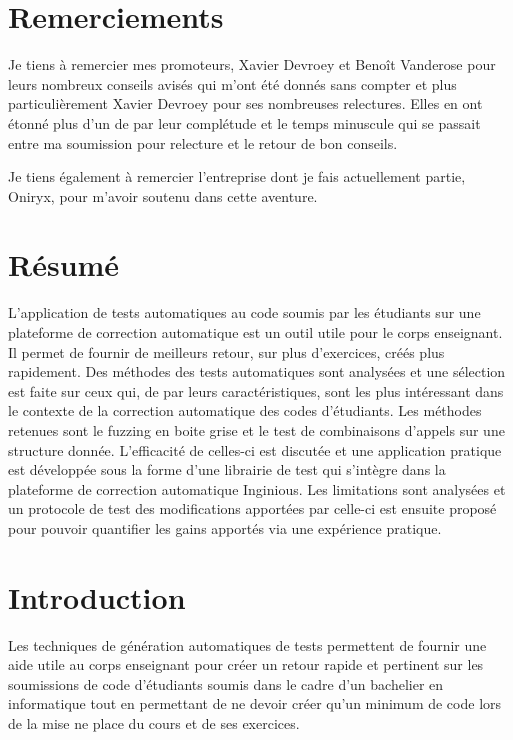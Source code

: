\documentclass[a4paper]{report}
\begin{document}
\nocite{*}
\chapter*{Remerciements}

Je tiens à remercier mes promoteurs, Xavier Devroey et Benoît Vanderose pour leurs nombreux conseils avisés qui m'ont été donnés sans compter et plus particulièrement Xavier Devroey pour ses nombreuses relectures.
Elles en ont étonné plus d'un de par leur complétude et le temps minuscule qui se passait entre ma soumission pour relecture et le retour de bon conseils.

Je tiens également à remercier l'entreprise dont je fais actuellement partie, Oniryx, pour m'avoir soutenu dans cette aventure.


\chapter*{Résumé}

L'application de tests automatiques au code soumis par les étudiants sur une plateforme de correction automatique est un outil utile pour le corps enseignant.
Il permet de fournir de meilleurs retour, sur plus d'exercices, créés plus rapidement.
Des méthodes des tests automatiques sont analysées et une sélection est faite sur ceux qui, de par leurs caractéristiques, sont les plus intéressant dans le contexte de la correction automatique des codes d'étudiants.
Les méthodes retenues sont le fuzzing en boite grise et le test de combinaisons d'appels sur une structure donnée.
L'efficacité de celles-ci est discutée et une application pratique est développée sous la forme d'une librairie de test qui s'intègre dans la plateforme de correction automatique Inginious.
Les limitations sont analysées et un protocole de test des modifications apportées par celle-ci est ensuite proposé pour pouvoir quantifier les gains apportés via une expérience pratique.



\tableofcontents

\chapter{Introduction}

Les techniques de génération automatiques de tests permettent de fournir une aide utile au corps enseignant pour créer un retour rapide et pertinent sur les soumissions de code d'étudiants soumis dans le cadre d'un bachelier en informatique tout en permettant de ne devoir créer qu'un minimum de code lors de la mise ne place du cours et de ses exercices.
\end{document}
